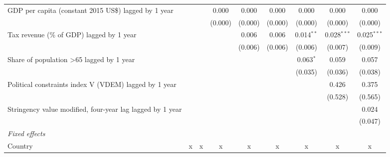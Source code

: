 \begin{tabular}{lcccccccc}
   GDP per capita (constant 2015 US\$) lagged by 1 year                        &              &              & 0.000         & 0.000         & 0.000         & 0.000          & 0.000         & 0.000\\   
                                                                               &              &              & (0.000)       & (0.000)       & (0.000)       & (0.000)        & (0.000)       & (0.000)\\   
   Tax revenue (\% of GDP) lagged by 1 year                                    &              &              &               & 0.006         & 0.006         & 0.014$^{**}$   & 0.028$^{***}$ & 0.025$^{***}$\\   
                                                                               &              &              &               & (0.006)       & (0.006)       & (0.006)        & (0.007)       & (0.009)\\   
   Share of population >65 lagged by 1 year                                    &              &              &               &               &               & 0.063$^{*}$    & 0.059         & 0.057\\   
                                                                               &              &              &               &               &               & (0.035)        & (0.036)       & (0.038)\\   
   Political constraints index V (VDEM) lagged by 1 year                       &              &              &               &               &               &                & 0.426         & 0.375\\   
                                                                               &              &              &               &               &               &                & (0.528)       & (0.565)\\   
   Stringency value modified, four-year lag lagged by 1 year                   &              &              &               &               &               &                &               & 0.024\\   
                                                                               &              &              &               &               &               &                &               & (0.047)\\   
   \emph{Fixed effects}\\
   Country                                                                     & x            & x            & x             & x             & x             & x              & x             & x\\  

\end{tabular}
